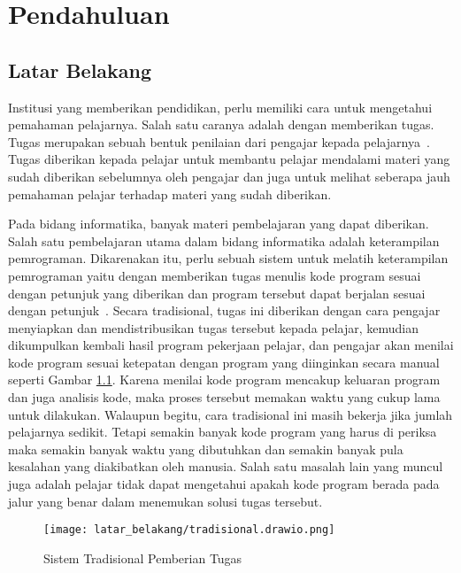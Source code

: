 \chapter{Pendahuluan}
\label{chap:intro}

\section{Latar Belakang}
\label{sec:1:latar_belakang}

Institusi yang memberikan pendidikan, perlu memiliki cara untuk mengetahui pemahaman pelajarnya. Salah satu caranya adalah dengan memberikan tugas. Tugas merupakan sebuah bentuk penilaian dari pengajar kepada pelajarnya~\cite{febriana:plagiarisme}. Tugas diberikan kepada pelajar untuk membantu pelajar mendalami materi yang sudah diberikan sebelumnya oleh pengajar dan juga untuk melihat seberapa jauh pemahaman pelajar terhadap materi yang sudah diberikan.

Pada bidang informatika, banyak materi pembelajaran yang dapat diberikan. Salah satu pembelajaran utama dalam bidang informatika adalah keterampilan pemrograman. Dikarenakan itu, perlu sebuah sistem untuk melatih keterampilan pemrograman yaitu dengan memberikan tugas menulis kode program sesuai dengan petunjuk yang diberikan dan program tersebut dapat berjalan sesuai dengan petunjuk~\cite{onder:judge}. Secara tradisional, tugas ini diberikan dengan cara pengajar menyiapkan dan mendistribusikan tugas tersebut kepada pelajar, kemudian dikumpulkan kembali hasil program pekerjaan pelajar, dan pengajar akan menilai kode program sesuai ketepatan dengan program yang diinginkan secara manual seperti Gambar \ref{fig:1:tradisional}. Karena menilai kode program mencakup keluaran program dan juga analisis kode, maka proses tersebut memakan waktu yang cukup lama untuk dilakukan. Walaupun begitu, cara tradisional ini masih bekerja jika jumlah pelajarnya sedikit.
Tetapi semakin banyak kode program yang harus di periksa maka semakin banyak waktu yang dibutuhkan dan semakin banyak pula kesalahan yang diakibatkan oleh manusia. Salah satu masalah lain yang muncul juga adalah pelajar tidak dapat mengetahui apakah kode program berada pada jalur yang benar dalam menemukan solusi tugas tersebut.

\begin{figure}[H]
    \centering
    \texttt{[image: latar\_belakang/tradisional.drawio.png]}
    \caption[Sistem Tradisional Pemberian Tugas]{Sistem Tradisional Pemberian Tugas}
    \label{fig:1:tradisional}
\end{figure}

